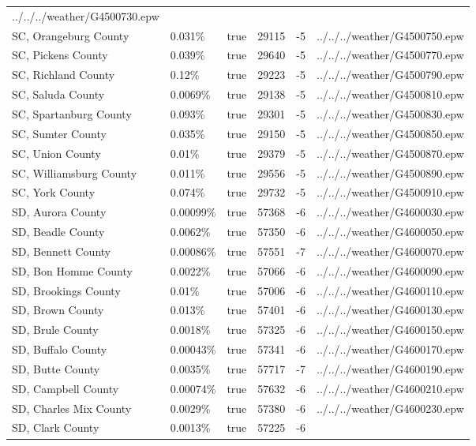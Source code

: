\begin{longtable}[]{@{}llllll@{}}
../../../weather/G4500730.epw \\
SC, Orangeburg County & 0.031\% & true & 29115 & -5 &
../../../weather/G4500750.epw \\
SC, Pickens County & 0.039\% & true & 29640 & -5 &
../../../weather/G4500770.epw \\
SC, Richland County & 0.12\% & true & 29223 & -5 &
../../../weather/G4500790.epw \\
SC, Saluda County & 0.0069\% & true & 29138 & -5 &
../../../weather/G4500810.epw \\
SC, Spartanburg County & 0.093\% & true & 29301 & -5 &
../../../weather/G4500830.epw \\
SC, Sumter County & 0.035\% & true & 29150 & -5 &
../../../weather/G4500850.epw \\
SC, Union County & 0.01\% & true & 29379 & -5 &
../../../weather/G4500870.epw \\
SC, Williamsburg County & 0.011\% & true & 29556 & -5 &
../../../weather/G4500890.epw \\
SC, York County & 0.074\% & true & 29732 & -5 &
../../../weather/G4500910.epw \\
SD, Aurora County & 0.00099\% & true & 57368 & -6 &
../../../weather/G4600030.epw \\
SD, Beadle County & 0.0062\% & true & 57350 & -6 &
../../../weather/G4600050.epw \\
SD, Bennett County & 0.00086\% & true & 57551 & -7 &
../../../weather/G4600070.epw \\
SD, Bon Homme County & 0.0022\% & true & 57066 & -6 &
../../../weather/G4600090.epw \\
SD, Brookings County & 0.01\% & true & 57006 & -6 &
../../../weather/G4600110.epw \\
SD, Brown County & 0.013\% & true & 57401 & -6 &
../../../weather/G4600130.epw \\
SD, Brule County & 0.0018\% & true & 57325 & -6 &
../../../weather/G4600150.epw \\
SD, Buffalo County & 0.00043\% & true & 57341 & -6 &
../../../weather/G4600170.epw \\
SD, Butte County & 0.0035\% & true & 57717 & -7 &
../../../weather/G4600190.epw \\
SD, Campbell County & 0.00074\% & true & 57632 & -6 &
../../../weather/G4600210.epw \\
SD, Charles Mix County & 0.0029\% & true & 57380 & -6 &
../../../weather/G4600230.epw \\
SD, Clark County & 0.0013\% & true & 57225 & -6 &

\end{longtable}
